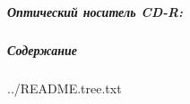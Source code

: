 \documentclass[12pt, a4paper, simple, twoside]{eskdtext}
\begin{document}
  


  \newpage
  \subparagraph{Оптический носитель CD-R:}

  \newpage
  \subparagraph{Содержание} \hspace{0pt}

  
  {../README.tree.txt}
\end{document}
